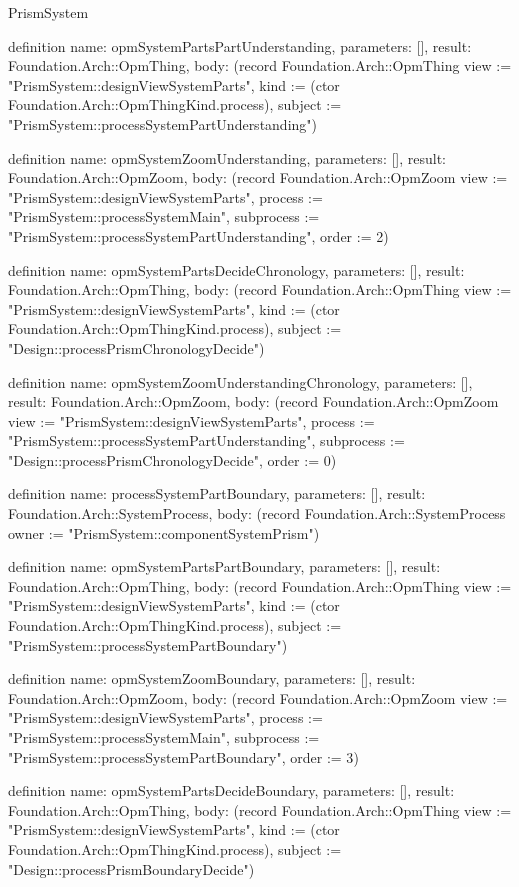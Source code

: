 \begin{lexlean}{PrismSystem}
\begin{semanticmodule}
definition{
  name: opmSystemPartsPartUnderstanding,
  parameters: [],
  result: Foundation.Arch::OpmThing,
  body: (record Foundation.Arch::OpmThing {view := "PrismSystem::designViewSystemParts", kind := (ctor Foundation.Arch::OpmThingKind.process), subject := "PrismSystem::processSystemPartUnderstanding"})
}

definition{
  name: opmSystemZoomUnderstanding,
  parameters: [],
  result: Foundation.Arch::OpmZoom,
  body: (record Foundation.Arch::OpmZoom {view := "PrismSystem::designViewSystemParts", process := "PrismSystem::processSystemMain", subprocess := "PrismSystem::processSystemPartUnderstanding", order := 2})
}

definition{
  name: opmSystemPartsDecideChronology,
  parameters: [],
  result: Foundation.Arch::OpmThing,
  body: (record Foundation.Arch::OpmThing {view := "PrismSystem::designViewSystemParts", kind := (ctor Foundation.Arch::OpmThingKind.process), subject := "Design::processPrismChronologyDecide"})
}

definition{
  name: opmSystemZoomUnderstandingChronology,
  parameters: [],
  result: Foundation.Arch::OpmZoom,
  body: (record Foundation.Arch::OpmZoom {view := "PrismSystem::designViewSystemParts", process := "PrismSystem::processSystemPartUnderstanding", subprocess := "Design::processPrismChronologyDecide", order := 0})
}

definition{
  name: processSystemPartBoundary,
  parameters: [],
  result: Foundation.Arch::SystemProcess,
  body: (record Foundation.Arch::SystemProcess {owner := "PrismSystem::componentSystemPrism"})
}

definition{
  name: opmSystemPartsPartBoundary,
  parameters: [],
  result: Foundation.Arch::OpmThing,
  body: (record Foundation.Arch::OpmThing {view := "PrismSystem::designViewSystemParts", kind := (ctor Foundation.Arch::OpmThingKind.process), subject := "PrismSystem::processSystemPartBoundary"})
}

definition{
  name: opmSystemZoomBoundary,
  parameters: [],
  result: Foundation.Arch::OpmZoom,
  body: (record Foundation.Arch::OpmZoom {view := "PrismSystem::designViewSystemParts", process := "PrismSystem::processSystemMain", subprocess := "PrismSystem::processSystemPartBoundary", order := 3})
}

definition{
  name: opmSystemPartsDecideBoundary,
  parameters: [],
  result: Foundation.Arch::OpmThing,
  body: (record Foundation.Arch::OpmThing {view := "PrismSystem::designViewSystemParts", kind := (ctor Foundation.Arch::OpmThingKind.process), subject := "Design::processPrismBoundaryDecide"})
}


\end{semanticmodule}
\end{lexlean}
